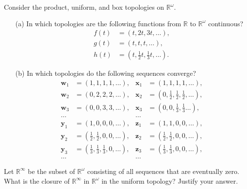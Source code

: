   \begin{exercise}[Munkres 20.4]
    Consider the product, uniform, and box topologies on $\mathbb{R}^\omega$.
    \begin{enumerate} 
      \item[(a)] In which topologies are the following functions from $\mathbb{R}$ to $\mathbb{R}^\omega$ continuous?
      \begin{align*}
        f(t) &= (t, 2t, 3t, \ldots), \\
        g(t) &= (t, t, t, \ldots), \\
        h(t) &= (t, \frac{1}{2}t, \frac{1}{3}t, \ldots).
      \end{align*}
      
      \item[(b)] In which topologies do the following sequences converge?
      \begin{align*}
        \mathbf{w}_1 &= (1, 1, 1, 1, \ldots), & \mathbf{x}_1 &= (1, 1, 1, 1, \ldots), \\
        \mathbf{w}_2 &= (0, 2, 2, 2, \ldots), & \mathbf{x}_2 &= (0, \frac{1}{2}, \frac{1}{2}, \frac{1}{2}, \ldots), \\
        \mathbf{w}_3 &= (0, 0, 3, 3, \ldots), & \mathbf{x}_3 &= (0, 0, \frac{1}{3}, \frac{1}{3} \ldots), \\
        \ldots & & \ldots \\
        \mathbf{y}_1 &= (1, 0, 0, 0, \ldots), & \mathbf{z}_1 &= (1, 1, 0, 0, \ldots), \\
        \mathbf{y}_2 &= (\frac{1}{2}, \frac{1}{2}, 0, 0, \ldots), & \mathbf{z}_2 &= (\frac{1}{2}, \frac{1}{2}, 0, 0, \ldots), \\
        \mathbf{y}_3 &= (\frac{1}{3}, \frac{1}{3}, \frac{1}{3}, 0, \ldots), & \mathbf{z}_3 &= (\frac{1}{3}, \frac{1}{3}, 0, 0, \ldots), \\
        \ldots & & \ldots
      \end{align*}
    \end{enumerate}
  \end{exercise}

  \begin{exercise}[Munkres 20.5]
    Let $\mathbb{R}^\infty$ be the subset of $\mathbb{R}^\omega$ consisting of all sequences that are eventually zero. What is the closure of $\mathbb{R}^\infty$ in $\mathbb{R}^\omega$ in the uniform topology? Justify your answer.
  \end{exercise}

